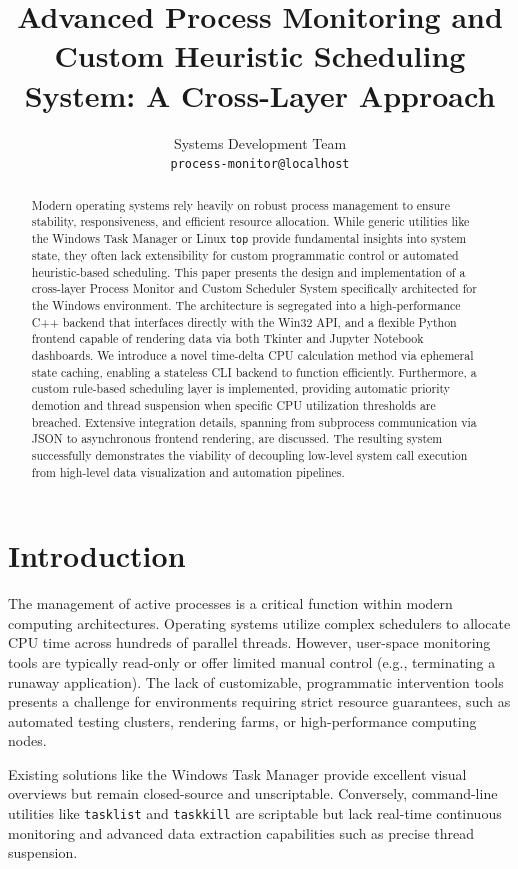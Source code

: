 \documentclass{article}
\title{Advanced Process Monitoring and Custom Heuristic Scheduling System: A Cross-Layer Approach}
\author{
  Systems Development Team \\
  \texttt{process-monitor@localhost} \\
}
\begin{document}
\maketitle

\begin{abstract}
Modern operating systems rely heavily on robust process management to ensure stability, responsiveness, and efficient resource allocation. While generic utilities like the Windows Task Manager or Linux \texttt{top} provide fundamental insights into system state, they often lack extensibility for custom programmatic control or automated heuristic-based scheduling. This paper presents the design and implementation of a cross-layer Process Monitor and Custom Scheduler System specifically architected for the Windows environment. The architecture is segregated into a high-performance C++ backend that interfaces directly with the Win32 API, and a flexible Python frontend capable of rendering data via both Tkinter and Jupyter Notebook dashboards. We introduce a novel time-delta CPU calculation method via ephemeral state caching, enabling a stateless CLI backend to function efficiently. Furthermore, a custom rule-based scheduling layer is implemented, providing automatic priority demotion and thread suspension when specific CPU utilization thresholds are breached. Extensive integration details, spanning from subprocess communication via JSON to asynchronous frontend rendering, are discussed. The resulting system successfully demonstrates the viability of decoupling low-level system call execution from high-level data visualization and automation pipelines.
\end{abstract}

\section{Introduction}
The management of active processes is a critical function within modern computing architectures. Operating systems utilize complex schedulers to allocate CPU time across hundreds of parallel threads. However, user-space monitoring tools are typically read-only or offer limited manual control (e.g., terminating a runaway application). The lack of customizable, programmatic intervention tools presents a challenge for environments requiring strict resource guarantees, such as automated testing clusters, rendering farms, or high-performance computing nodes.

Existing solutions like the Windows Task Manager provide excellent visual overviews but remain closed-source and unscriptable. Conversely, command-line utilities like \texttt{tasklist} and \texttt{taskkill} are scriptable but lack real-time continuous monitoring and advanced data extraction capabilities such as precise thread suspension. 
\end{document}
